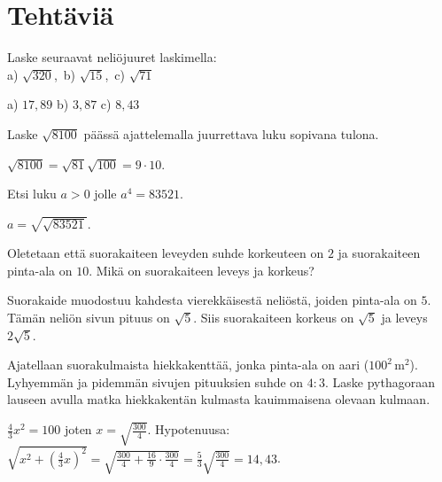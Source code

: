 \section*{Tehtäviä}

\begin{tehtava}
Laske seuraavat neliöjuuret laskimella:\\ 
a) $\sqrt{320}$,\ b) $\sqrt{15}$,\ c) $\sqrt{71}$
\begin{vastaus}
a) $17{,}89$ b) $3{,}87$ c) $8{,}43$
\end{vastaus}
\end{tehtava}


\begin{tehtava}
Laske $\sqrt{8100}$ päässä ajattelemalla juurrettava luku sopivana tulona.
\begin{vastaus}
$\sqrt{8100}=\sqrt{81}\sqrt{100}=9\cdot 10$.
\end{vastaus}
\end{tehtava}


\begin{tehtava}
Etsi luku $a>0$ jolle $a^4=83521$.
\begin{vastaus}
$a=\sqrt{\sqrt{83521}}$.
\end{vastaus}
\end{tehtava}


\begin{tehtava}
Oletetaan että suorakaiteen leveyden suhde korkeuteen on $2$ ja suorakaiteen pinta-ala on $10$. Mikä on suorakaiteen 
leveys ja korkeus?
\begin{vastaus}
Suorakaide muodostuu kahdesta vierekkäisestä neliöstä, joiden pinta-ala on $5$. Tämän neliön sivun pituus on $\sqrt{5}$.
Siis suorakaiteen korkeus on $\sqrt{5}$ ja leveys $2\sqrt{5}$.
\end{vastaus}
\end{tehtava}


\begin{tehtava}
Ajatellaan suorakulmaista hiekkakenttää, jonka pinta-ala on aari ($100^2 \, \mathrm{m}^2$). Lyhyemmän ja pidemmän sivujen 
pituuksien suhde on $4:3$. Laske pythagoraan lauseen avulla matka hiekkakentän kulmasta kauimmaisena olevaan kulmaan.
\begin{vastaus}
$\frac{4}{3}x^2=100$ joten $x = \sqrt{\frac{300}{4}}$. 
Hypotenuusa: $\sqrt{x^2 + (\frac{4}{3}x)^2}=\sqrt{\frac{300}{4}+\frac{16}{9}\cdot \frac{300}{4}}
=\frac{5}{3}\sqrt{\frac{300}{4}}=14{,}43$.
\end{vastaus}
\end{tehtava}


